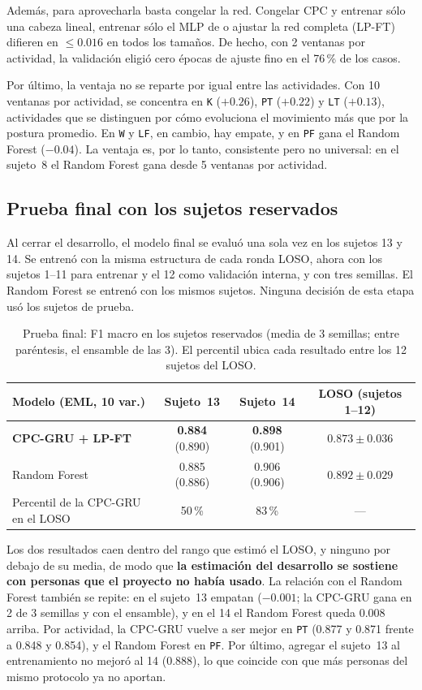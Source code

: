 \documentclass[letterpaper,11pt]{article}
\newcommand{\act}[1]{\texttt{#1}}
\begin{document}
Además, para aprovecharla basta congelar la red. Congelar CPC y entrenar sólo una cabeza lineal, entrenar sólo el MLP de \textcite{haresamudram2021} o ajustar la red completa (LP-FT) difieren en $\le 0.016$ en todos los tamaños. De hecho, con 2 ventanas por actividad, la validación eligió cero épocas de ajuste fino en el 76\,\% de los casos.

Por último, la ventaja no se reparte por igual entre las actividades. Con 10 ventanas por actividad, se concentra en \act{K} ($+0.26$), \act{PT} ($+0.22$) y \act{LT} ($+0.13$), actividades que se distinguen por cómo evoluciona el movimiento más que por la postura promedio. En \act{W} y \act{LF}, en cambio, hay empate, y en \act{PF} gana el Random Forest ($-0.04$). La ventaja es, por lo tanto, consistente pero no universal: en el sujeto~8 el Random Forest gana desde 5 ventanas por actividad.

\subsection{Prueba final con los sujetos reservados}
\label{sec:prueba_final}
Al cerrar el desarrollo, el modelo final se evaluó una sola vez en los sujetos 13 y 14. Se entrenó con la misma estructura de cada ronda LOSO, ahora con los sujetos 1--11 para entrenar y el 12 como validación interna, y con tres semillas. El Random Forest se entrenó con los mismos sujetos. Ninguna decisión de esta etapa usó los sujetos de prueba.

\begin{table}[H]
  \centering
  \small
  \caption{Prueba final: F1 macro en los sujetos reservados (media de 3 semillas; entre paréntesis, el ensamble de las 3). El percentil ubica cada resultado entre los 12 sujetos del LOSO.}
  \label{tab:prueba_final}
  \begin{tabular}{lccc}
    \toprule
    Modelo (EML, 10 var.) & Sujeto~13 & Sujeto~14 & LOSO (sujetos 1--12) \\
    \midrule
    \textbf{CPC-GRU + LP-FT} & \textbf{0.884} (0.890) & \textbf{0.898} (0.901) & $0.873 \pm 0.036$ \\
    Random Forest & 0.885 (0.886) & 0.906 (0.906) & $0.892 \pm 0.029$ \\
    \midrule
    Percentil de la CPC-GRU en el LOSO & 50\,\% & 83\,\% & --- \\
    \bottomrule
  \end{tabular}
\end{table}

Los dos resultados caen dentro del rango que estimó el LOSO, y ninguno por debajo de su media, de modo que \textbf{la estimación del desarrollo se sostiene con personas que el proyecto no había usado}. La relación con el Random Forest también se repite: en el sujeto~13 empatan ($-0.001$; la CPC-GRU gana en 2 de 3 semillas y con el ensamble), y en el 14 el Random Forest queda 0.008 arriba. Por actividad, la CPC-GRU vuelve a ser mejor en \act{PT} (0.877 y 0.871 frente a 0.848 y 0.854), y el Random Forest en \act{PF}. Por último, agregar el sujeto~13 al entrenamiento no mejoró al 14 (0.888), lo que coincide con que más personas del mismo protocolo ya no aportan.
\end{document}
